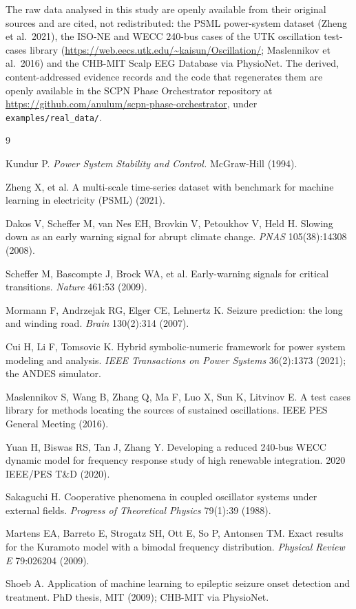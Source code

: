 \documentclass[aip,cha,preprint,amsmath,amssymb]{revtex4-2}
\newcommand{\code}[1]{\texttt{#1}}
\begin{document}
The raw data analysed in this study are openly available from their
original sources and are cited, not redistributed: the PSML power-system
dataset (Zheng et al.\ 2021), the ISO-NE and WECC 240-bus cases of the
UTK oscillation test-cases library
(\url{https://web.eecs.utk.edu/~kaisun/Oscillation/}; Maslennikov et
al.\ 2016) and the CHB-MIT Scalp EEG Database via PhysioNet. The
derived, content-addressed evidence records and the code that
regenerates them are openly available in the SCPN Phase Orchestrator
repository at \url{https://github.com/anulum/scpn-phase-orchestrator},
under \code{examples/real\_data/}.

\begin{thebibliography}{9}

 Kundur P. \emph{Power System Stability and
Control.} McGraw-Hill (1994).

 Zheng X, et al. A multi-scale time-series dataset
with benchmark for machine learning in electricity (PSML) (2021).

 Dakos V, Scheffer M, van Nes EH, Brovkin V,
Petoukhov V, Held H. Slowing down as an early warning signal for abrupt
climate change. \emph{PNAS} 105(38):14308 (2008).

 Scheffer M, Bascompte J, Brock WA, et al.
Early-warning signals for critical transitions. \emph{Nature} 461:53
(2009).

 Mormann F, Andrzejak RG, Elger CE, Lehnertz K.
Seizure prediction: the long and winding road. \emph{Brain} 130(2):314
(2007).

 Cui H, Li F, Tomsovic K. Hybrid symbolic-numeric
framework for power system modeling and analysis. \emph{IEEE
Transactions on Power Systems} 36(2):1373 (2021); the ANDES simulator.

 Maslennikov S, Wang B, Zhang Q, Ma F, Luo X,
Sun K, Litvinov E. A test cases library for methods locating the
sources of sustained oscillations. IEEE PES General Meeting (2016).

 Yuan H, Biswas RS, Tan J, Zhang Y. Developing a
reduced 240-bus WECC dynamic model for frequency response study of high
renewable integration. 2020 IEEE/PES T\&D (2020).

 Sakaguchi H. Cooperative phenomena in coupled
oscillator systems under external fields. \emph{Progress of
Theoretical Physics} 79(1):39 (1988).

 Martens EA, Barreto E, Strogatz SH, Ott E, So P,
Antonsen TM. Exact results for the Kuramoto model with a bimodal
frequency distribution. \emph{Physical Review E} 79:026204 (2009).

 Shoeb A. Application of machine learning to
epileptic seizure onset detection and treatment. PhD thesis, MIT
(2009); CHB-MIT via PhysioNet.

\end{thebibliography}
\end{document}
